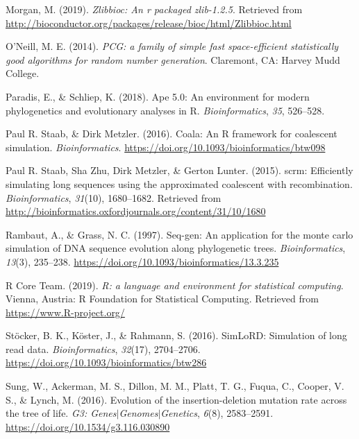\documentclass[12pt,]{article}
\begin{document}
\leavevmode\hypertarget{ref-Morgan_2019}{}%
Morgan, M. (2019). \emph{Zlibbioc: An r packaged zlib-1.2.5}. Retrieved from \url{http://bioconductor.org/packages/release/bioc/html/Zlibbioc.html}

\leavevmode\hypertarget{ref-Oneill_2014pcg}{}%
O'Neill, M. E. (2014). \emph{PCG: a family of simple fast space-efficient statistically good algorithms for random number generation}. Claremont, CA: Harvey Mudd College.

\leavevmode\hypertarget{ref-Paradis_2018}{}%
Paradis, E., \& Schliep, K. (2018). Ape 5.0: An environment for modern phylogenetics and evolutionary analyses in R. \emph{Bioinformatics}, \emph{35}, 526--528.

\leavevmode\hypertarget{ref-Paul_R._Staab_2016}{}%
Paul R. Staab, \& Dirk Metzler. (2016). Coala: An R framework for coalescent simulation. \emph{Bioinformatics}. \url{https://doi.org/10.1093/bioinformatics/btw098}

\leavevmode\hypertarget{ref-Paul_R._Staab_2015}{}%
Paul R. Staab, Sha Zhu, Dirk Metzler, \& Gerton Lunter. (2015). scrm: Efficiently simulating long sequences using the approximated coalescent with recombination. \emph{Bioinformatics}, \emph{31}(10), 1680--1682. Retrieved from \url{http://bioinformatics.oxfordjournals.org/content/31/10/1680}

\leavevmode\hypertarget{ref-Rambaut_1997}{}%
Rambaut, A., \& Grass, N. C. (1997). Seq-gen: An application for the monte carlo simulation of DNA sequence evolution along phylogenetic trees. \emph{Bioinformatics}, \emph{13}(3), 235--238. \url{https://doi.org/10.1093/bioinformatics/13.3.235}

\leavevmode\hypertarget{ref-R_Core_Team_2019}{}%
R Core Team. (2019). \emph{R: a language and environment for statistical computing}. Vienna, Austria: R Foundation for Statistical Computing. Retrieved from \url{https://www.R-project.org/}

\leavevmode\hypertarget{ref-St_cker_2016}{}%
Stöcker, B. K., Köster, J., \& Rahmann, S. (2016). SimLoRD: Simulation of long read data. \emph{Bioinformatics}, \emph{32}(17), 2704--2706. \url{https://doi.org/10.1093/bioinformatics/btw286}

\leavevmode\hypertarget{ref-Sung_2016}{}%
Sung, W., Ackerman, M. S., Dillon, M. M., Platt, T. G., Fuqua, C., Cooper, V. S., \& Lynch, M. (2016). Evolution of the insertion-deletion mutation rate across the tree of life. \emph{G3: Genes\(\vert\)Genomes\(\vert\)Genetics}, \emph{6}(8), 2583--2591. \url{https://doi.org/10.1534/g3.116.030890}
\end{document}
